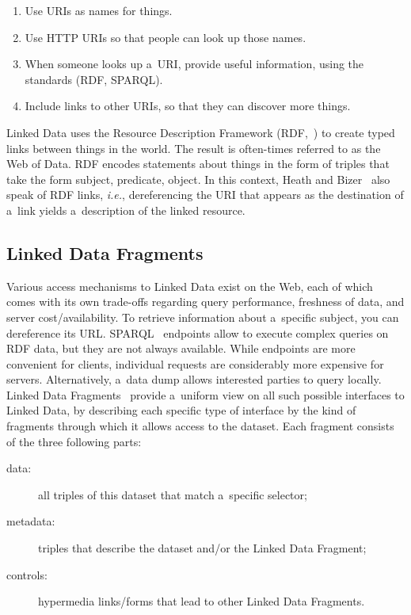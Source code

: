 \documentclass[runningheads,a4paper]{llncs}
\begin{document}
\begin{enumerate}
	\item Use URIs as names for things.
	\item Use HTTP URIs so that people can look up those names.
	\item When someone looks up a~URI, provide useful information, using the standards (RDF, SPARQL).
	\item Include links to other URIs, so that they can discover more things.
\end{enumerate}

Linked Data uses the Resource Description Framework (RDF,~\cite{klyne2004rdf})
to create typed links between things in the world.
The result is often-times referred to as the Web of Data.
RDF encodes statements about things in the form of triples that take the form subject, predicate, object. 
In this context, Heath and Bizer~\cite{bizer2009linkeddatastory} also speak of RDF links,
\emph{i.e.}, dereferencing the URI that appears as the destination of a~link
yields a~description of the linked resource.

\subsection{Linked Data Fragments}
Various access mechanisms to Linked Data exist on the Web,
each of which comes with its own trade-offs regarding query performance, freshness of data,
and server cost/availability.
To retrieve information about a~specific subject, you can dereference its URL.
SPARQL~\cite{prudhommeaux2008sparql} endpoints allow to execute complex queries on RDF data,
but they are not always available.
While endpoints are more convenient for clients, individual requests
are considerably more expensive for servers.
Alternatively, a~data dump allows interested parties to query locally.
Linked Data Fragments~\cite{verborgh2014ldf} provide a~uniform view
on all such possible interfaces to Linked Data,
by describing each specific type of interface by the kind of fragments through which
it allows access to the dataset.
Each fragment consists of the three following parts:

\begin{description}
	\item[data:] all triples of this dataset that match a~specific selector;
	\item[metadata:] triples that describe the dataset and/or the Linked Data Fragment;
	\item[controls:] hypermedia links/forms that lead to other Linked Data Fragments.
\end{description}
\end{document}
